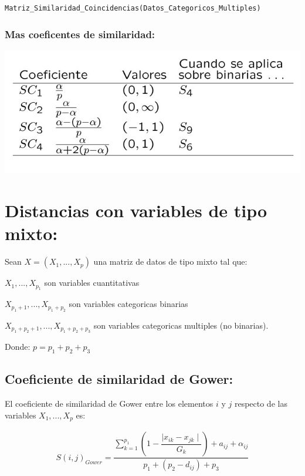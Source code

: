 \documentclass[12pt]{report} %
\begin{document}
\begin{lstlisting}
Matriz_Similaridad_Coincidencias(Datos_Categoricos_Multiples) 
\end{lstlisting}


 


\newpage

\subsection{Mas coeficentes de similaridad:}

\includegraphics[scale=0.8]{similaridades 3.jpg}






\newpage




\chapter{Distancias con variables de tipo mixto:}

Sean $X=(X_1,...,X_p)$ una matriz de datos de tipo mixto tal que:

$X_1,...,X_{p_1}$ son variables cuantitativas

$X_{p_1 + 1},...,X_{p_1 + p_2}$ son variables categoricas binarias

$X_{p_1 + p_2 + 1},...,X_{p_1 + p_2 + p_3}$ son variables categoricas multiples (no binarias).  

Donde:\hspace{0.2cm} $p=p_1 + p_2 + p_3$

\section{Coeficiente de similaridad de Gower:}

\begin{tcolorbox}[toptitle=2mm,title=  Coeficiente de similaridad de Gower:   ]

El coeficiente de similaridad de Gower entre los elementos $i$ y $j$ respecto de las variables $X_1,...,X_p$ es:

\begin{gather*}
S(i,j)_{Gower}=\dfrac{\sum_{k=1}^{p_1} \left(1- \dfrac{\mid x_{ik} - x_{jk} \mid}{G_k} \right) + a_{ij} + \alpha_{ij} }{p_1 + (p_2 - d_{ij}) + p_3}
\end{gather*}

\end{tcolorbox}
\end{document}
